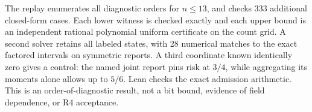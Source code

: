 \documentclass{article}
\begin{document}
The replay enumerates all diagnostic orders for \(n\le13\),
and checks 333 additional closed-form cases. Each lower witness
is checked exactly and each upper bound is an independent
rational polynomial uniform certificate on the count grid.
A second solver retains all labeled states, with 28 numerical
matches to the exact factored intervals on symmetric reports.
A third coordinate known identically zero gives a control: the
named joint report pins risk at \(3/4\), while aggregating its
moments alone allows up to \(5/6\). Lean checks the exact
admission arithmetic. This is an order-of-diagnostic result,
not a bit bound, evidence of field dependence, or R4 acceptance.
\end{document}
